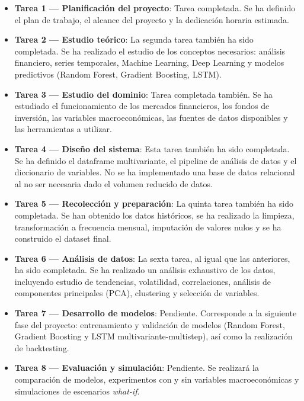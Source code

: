 \begin{itemize}
    \item \textbf{Tarea 1 — Planificación del proyecto}: Tarea completada. Se ha definido el plan de trabajo, el alcance del proyecto y la dedicación horaria estimada.
    
    \item \textbf{Tarea 2 — Estudio teórico}: La segunda tarea también ha sido completada. Se ha realizado el estudio de los conceptos necesarios: análisis financiero, series temporales, Machine Learning, Deep Learning y modelos predictivos (Random Forest, Gradient Boosting, LSTM).
    
    \item \textbf{Tarea 3 — Estudio del dominio}: Tarea completada también. Se ha estudiado el funcionamiento de los mercados financieros, los fondos de inversión, las variables macroeconómicas, las fuentes de datos disponibles y las herramientas a utilizar.
    
    \item \textbf{Tarea 4 — Diseño del sistema}: Esta tarea también ha sido completada. Se ha definido el dataframe multivariante, el pipeline de análisis de datos y el diccionario de variables. No se ha implementado una base de datos relacional al no ser necesaria dado el volumen reducido de datos.
    
    \item \textbf{Tarea 5 — Recolección y preparación}: La quinta tarea también ha sido completada. Se han obtenido los datos históricos, se ha realizado la limpieza, transformación a frecuencia mensual, imputación de valores nulos y se ha construido el dataset final.
    
    \item \textbf{Tarea 6 — Análisis de datos}: La sexta tarea, al igual que las anteriores, ha sido completada. Se ha realizado un análisis exhaustivo de los datos, incluyendo estudio de tendencias, volatilidad, correlaciones, análisis de componentes principales (PCA), clustering y selección de variables.
    
    \item \textbf{Tarea 7 — Desarrollo de modelos}: Pendiente. Corresponde a la siguiente fase del proyecto: entrenamiento y validación de modelos (Random Forest, Gradient Boosting y LSTM multivariante-multistep), así como la realización de backtesting.
    
    \item \textbf{Tarea 8 — Evaluación y simulación}: Pendiente. Se realizará la comparación de modelos, experimentos con y sin variables macroeconómicas y simulaciones de escenarios \textit{what-if}.
    

\end{itemize}
